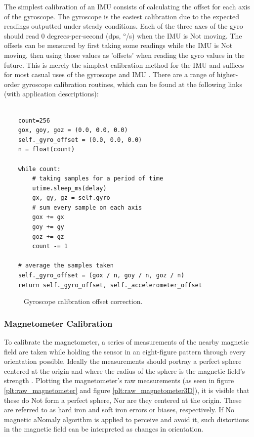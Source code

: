 The simplest calibration of an IMU consists of calculating the offset for each axis of the gyroscope. The gyroscope is the easiest calibration due to the expected readings outputted under steady conditions. Each of the three axes of the gyro should read 0 degrees-per-second (dps, °/s) when the IMU is Not moving. The offsets can be measured by first taking some readings while the IMU is Not moving, then using those values as 'offsets' when reading the gyro values in the future. This is merely the simplest calibration method for the IMU and suffices for most casual uses of the gyroscope and IMU \cite{olivares2009high}. There are a range of  higher-order gyroscope calibration routines, which can be found at the following links (with application descriptions):

\lstset{language=Python}

\begin{lstlisting}[frame=single]  % Start your code-block

    count=256
    gox, goy, goz = (0.0, 0.0, 0.0)
    self._gyro_offset = (0.0, 0.0, 0.0) 
    n = float(count)

    while count:
        # taking samples for a period of time
        utime.sleep_ms(delay)
        gx, gy, gz = self.gyro
        # sum every sample on each axis
        gox += gx
        goy += gy
        goz += gz
        count -= 1

    # average the samples taken
    self._gyro_offset = (gox / n, goy / n, goz / n)
    return self._gyro_offset, self._accelerometer_offset
\end{lstlisting}

\begin{figure}[!h]
    \centering
    \resizebox{0.8\linewidth}{!}{}
    \caption{Gyroscope calibration offset correction.}
\end{figure}

\subsubsection{Magnetometer Calibration}

To calibrate the magnetometer, a series of measurements of the nearby magnetic field are taken while holding the sensor in an eight-figure pattern through every orientation possible. Ideally the measurements should portray a perfect sphere centered at the origin and where the radius of the sphere is the magnetic field's strength \cite{kok2016magnetometer}. Plotting the magnetometer's raw measurements (as seen in figure \ref{plt:raw_magnetometer} and figure \ref{plt:raw_magnetometer3D}), it is visible that these do Not form a perfect sphere, Nor are they centered at the origin. These are referred to as hard iron and soft iron errors or biases, respectively. If No magnetic aNomaly algorithm is applied to perceive and avoid it, such distortions in the magnetic field can be interpreted as changes in orientation.

